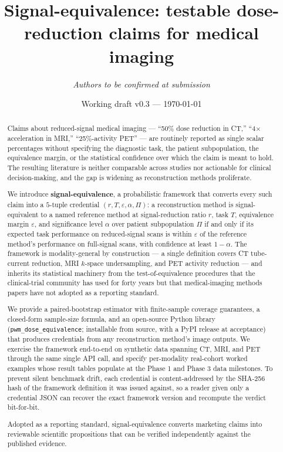 \documentclass[twoside,11pt]{article}
\title{\textbf{Signal-equivalence: testable dose-reduction claims for medical imaging}}
\author[1,2]{\textit{Authors to be confirmed at submission}}
\affil[1]{University of Texas Southwestern Medical Center, Dallas, TX, USA}
\affil[2]{PWM Protocol Foundation}
\date{Working draft v0.3 --- \today}
\begin{document}
\maketitle

\begin{abstract}
\noindent Claims about reduced-signal medical imaging --- ``50\% dose reduction in CT,'' ``4$\times$ acceleration in MRI,'' ``25\%-activity PET'' --- are routinely reported as single scalar percentages without specifying the diagnostic task, the patient subpopulation, the equivalence margin, or the statistical confidence over which the claim is meant to hold. The resulting literature is neither comparable across studies nor actionable for clinical decision-making, and the gap is widening as reconstruction methods proliferate.
\par
We introduce \textbf{signal-equivalence}, a probabilistic framework that converts every such claim into a $5$-tuple credential $(r, T, \varepsilon, \alpha, \Pi)$: a reconstruction method is signal-equivalent to a named reference method at signal-reduction ratio $r$, task $T$, equivalence margin $\varepsilon$, and significance level $\alpha$ over patient subpopulation $\Pi$ if and only if its expected task performance on reduced-signal scans is within $\varepsilon$ of the reference method's performance on full-signal scans, with confidence at least $1-\alpha$. The framework is modality-general by construction --- a single definition covers CT tube-current reduction, MRI $k$-space undersampling, and PET activity reduction --- and inherits its statistical machinery from the test-of-equivalence procedures that the clinical-trial community has used for forty years but that medical-imaging methods papers have not adopted as a reporting standard.
\par
We provide a paired-bootstrap estimator with finite-sample coverage guarantees, a closed-form sample-size formula, and an open-source Python library (\texttt{pwm\_dose\_equivalence}; installable from source, with a PyPI release at acceptance) that produces credentials from any reconstruction method's image outputs. We exercise the framework end-to-end on synthetic data spanning CT, MRI, and PET through the same single API call, and specify per-modality real-cohort worked examples whose result tables populate at the Phase 1 and Phase 3 data milestones. To prevent silent benchmark drift, each credential is content-addressed by the SHA-256 hash of the framework definition it was issued against, so a reader given only a credential JSON can recover the exact framework version and recompute the verdict bit-for-bit.
\par
Adopted as a reporting standard, signal-equivalence converts marketing claims into reviewable scientific propositions that can be verified independently against the published evidence.
\end{abstract}
\end{document}

